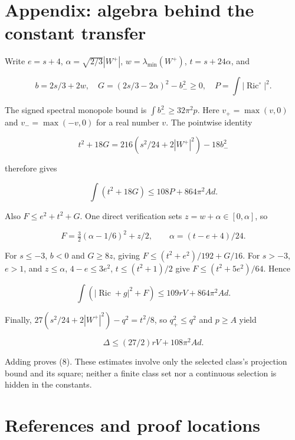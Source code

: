 \documentclass[
  10pt,
]{article}
\begin{document}
\hypertarget{appendix-algebra-behind-the-constant-transfer}{%
\section{Appendix: algebra behind the constant
transfer}\label{appendix-algebra-behind-the-constant-transfer}}

Write \(e=s+4\), \(\alpha=\sqrt{2/3}|W^+|\), \(w=\lambda_{\min}(W^+)\),
\(t=s+24\alpha\), and

\[
b=2s/3+2w,\quad
G=(2s/3-2\alpha)^2-b_-^2\ge0,\quad
P=\int|\operatorname{Ric}^{\circ}|^2.
\]

The signed spectral monopole bound is \(\int b_-^2\ge32\pi^2p\). Here
\(v_+=\max(v,0)\) and \(v_-=\max(-v,0)\) for a real number \(v\). The
pointwise identity

\[
t^2+18G=216(s^2/24+2|W^+|^2)-18b_-^2
\]

therefore gives

\[
\int(t^2+18G)\le108P+864\pi^2Ad.
\]

Also \(F\le e^2+t^2+G\). One direct verification sets
\(z=w+\alpha\in[0,\alpha]\), so

\[
F=\tfrac32(\alpha-1/6)^2+z/2,\qquad
\alpha=(t-e+4)/24.
\]

For \(s\le-3\), \(b<0\) and \(G\ge8z\), giving
\(F\le(t^2+e^2)/192+G/16\). For \(s>-3\), \(e>1\), and \(z\le\alpha\),
\(4-e\le3e^2\), \(t\le(t^2+1)/2\) give \(F\le(t^2+5e^2)/64\). Hence

\[
\int(|\operatorname{Ric}+g|^2+F)
 \le109rV+864\pi^2Ad.
\]

Finally, \(27(s^2/24+2|W^+|^2)-q^2=t^2/8\), so \(q_+^2\le q^2\) and
\(p\ge A\) yield

\[
\Delta\le(27/2)rV+108\pi^2Ad.
\]

Adding proves (8). These estimates involve only the selected class's
projection bound and its square; neither a finite class set nor a
continuous selection is hidden in the constants.

\hypertarget{references-and-proof-locations}{%
\section{References and proof
locations}\label{references-and-proof-locations}}
\end{document}
